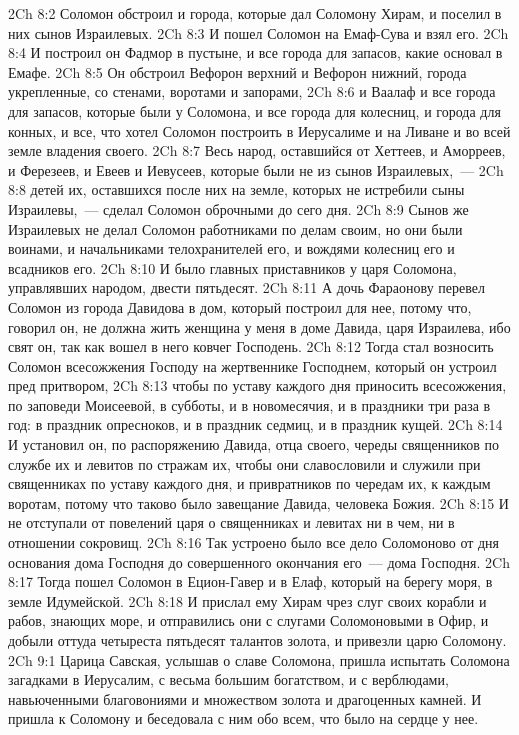 \vs 2Ch 8:2 Соломон обстроил и города, которые дал Соломону Хирам, и поселил в них сынов Израилевых.
\vs 2Ch 8:3 И пошел Соломон на Емаф-Сува и взял его.
\vs 2Ch 8:4 И построил он Фадмор в пустыне, и все города для запасов, какие основал в Емафе.
\vs 2Ch 8:5 Он обстроил Вефорон верхний и Вефорон нижний, города укрепленные, со стенами, воротами и запорами,
\vs 2Ch 8:6 и Ваалаф и все города для запасов, которые были у Соломона, и все города для колесниц, и города для конных, и все, что хотел Соломон построить в Иерусалиме и на Ливане и во всей земле владения своего.
\rsbpar\vs 2Ch 8:7 Весь народ, оставшийся от Хеттеев, и Аморреев, и Ферезеев, и Евеев и Иевусеев, которые были не из сынов Израилевых,~---
\vs 2Ch 8:8 детей их, оставшихся после них на земле, которых не истребили сыны Израилевы,~--- сделал Соломон оброчными до сего дня.
\vs 2Ch 8:9 Сынов же Израилевых не делал Соломон работниками по делам своим, но они были воинами, и начальниками телохранителей его, и вождями колесниц его и всадников его.
\vs 2Ch 8:10 И было главных приставников у царя Соломона, управлявших народом, двести пятьдесят.
\vs 2Ch 8:11 А дочь Фараонову перевел Соломон из города Давидова в дом, который построил для нее, потому что, говорил он, не должна жить женщина у меня в доме Давида, царя Израилева, ибо свят он, так как вошел в него ковчег Господень.
\rsbpar\vs 2Ch 8:12 Тогда стал возносить Соломон всесожжения Господу на жертвеннике Господнем, который он устроил пред притвором,
\vs 2Ch 8:13 чтобы по уставу каждого дня приносить всесожжения, по заповеди Моисеевой, в субботы, и в новомесячия, и в праздники три раза в год: в праздник опресноков, и в праздник седмиц, и в праздник кущей.
\vs 2Ch 8:14 И установил он, по распоряжению Давида, отца своего, череды священников по службе их и левитов по стражам их, чтобы они славословили и служили при священниках по уставу каждого дня, и привратников по чередам их, к каждым воротам, потому что таково было завещание Давида, человека Божия.
\vs 2Ch 8:15 И не отступали от повелений царя о священниках и левитах ни в чем, ни в отношении сокровищ.
\vs 2Ch 8:16 Так устроено было все дело Соломоново от дня основания дома Господня до совершенного окончания его~--- дома Господня.
\rsbpar\vs 2Ch 8:17 Тогда пошел Соломон в Ецион-Гавер и в Елаф, который на берегу моря, в земле Идумейской.
\vs 2Ch 8:18 И прислал ему Хирам чрез слуг своих корабли и рабов, знающих море, и отправились они с слугами Соломоновыми в Офир, и добыли оттуда четыреста пятьдесят талантов золота, и привезли царю Соломону.
\vs 2Ch 9:1 Царица Савская, услышав о славе Соломона, пришла испытать Соломона загадками в Иерусалим, с весьма большим богатством, и с верблюдами, навьюченными благовониями и множеством золота и драгоценных камней. И пришла к Соломону и беседовала с ним обо всем, что было на сердце у нее.
